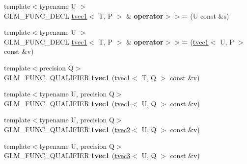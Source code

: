\begin{DoxyCompactItemize}
\item 
{\footnotesize template$<$typename U $>$ }\\G\+L\+M\+\_\+\+F\+U\+N\+C\+\_\+\+D\+E\+CL \hyperlink{structglm_1_1detail_1_1tvec1}{tvec1}$<$ T, P $>$ \& {\bfseries operator$>$$>$=} (U const \&s)\hypertarget{structglm_1_1detail_1_1tvec1_a19aaf3b4350fe2a5c245775e4fa4d80c}{}\label{structglm_1_1detail_1_1tvec1_a19aaf3b4350fe2a5c245775e4fa4d80c}

\item 
{\footnotesize template$<$typename U $>$ }\\G\+L\+M\+\_\+\+F\+U\+N\+C\+\_\+\+D\+E\+CL \hyperlink{structglm_1_1detail_1_1tvec1}{tvec1}$<$ T, P $>$ \& {\bfseries operator$>$$>$=} (\hyperlink{structglm_1_1detail_1_1tvec1}{tvec1}$<$ U, P $>$ const \&v)\hypertarget{structglm_1_1detail_1_1tvec1_a9cbcbbf300a0197e674bc97e277f9683}{}\label{structglm_1_1detail_1_1tvec1_a9cbcbbf300a0197e674bc97e277f9683}

\item 
{\footnotesize template$<$precision Q$>$ }\\G\+L\+M\+\_\+\+F\+U\+N\+C\+\_\+\+Q\+U\+A\+L\+I\+F\+I\+ER {\bfseries tvec1} (\hyperlink{structglm_1_1detail_1_1tvec1}{tvec1}$<$ T, Q $>$ const \&v)\hypertarget{structglm_1_1detail_1_1tvec1_a78ba11094b516ebbb487a9c37714d7c0}{}\label{structglm_1_1detail_1_1tvec1_a78ba11094b516ebbb487a9c37714d7c0}

\item 
{\footnotesize template$<$typename U, precision Q$>$ }\\G\+L\+M\+\_\+\+F\+U\+N\+C\+\_\+\+Q\+U\+A\+L\+I\+F\+I\+ER {\bfseries tvec1} (\hyperlink{structglm_1_1detail_1_1tvec1}{tvec1}$<$ U, Q $>$ const \&v)\hypertarget{structglm_1_1detail_1_1tvec1_a608940c30970eec33519348c3fedcb6f}{}\label{structglm_1_1detail_1_1tvec1_a608940c30970eec33519348c3fedcb6f}

\item 
{\footnotesize template$<$typename U, precision Q$>$ }\\G\+L\+M\+\_\+\+F\+U\+N\+C\+\_\+\+Q\+U\+A\+L\+I\+F\+I\+ER {\bfseries tvec1} (\hyperlink{structglm_1_1detail_1_1tvec2}{tvec2}$<$ U, Q $>$ const \&v)\hypertarget{structglm_1_1detail_1_1tvec1_a83c61bae71b14ac2cba715eee715dea7}{}\label{structglm_1_1detail_1_1tvec1_a83c61bae71b14ac2cba715eee715dea7}

\item 
{\footnotesize template$<$typename U, precision Q$>$ }\\G\+L\+M\+\_\+\+F\+U\+N\+C\+\_\+\+Q\+U\+A\+L\+I\+F\+I\+ER {\bfseries tvec1} (\hyperlink{structglm_1_1detail_1_1tvec3}{tvec3}$<$ U, Q $>$ const \&v)\hypertarget{structglm_1_1detail_1_1tvec1_a3c252050abfe0ec01b6ff89566883d8f}{}\label{structglm_1_1detail_1_1tvec1_a3c252050abfe0ec01b6ff89566883d8f}


\end{DoxyCompactItemize}
